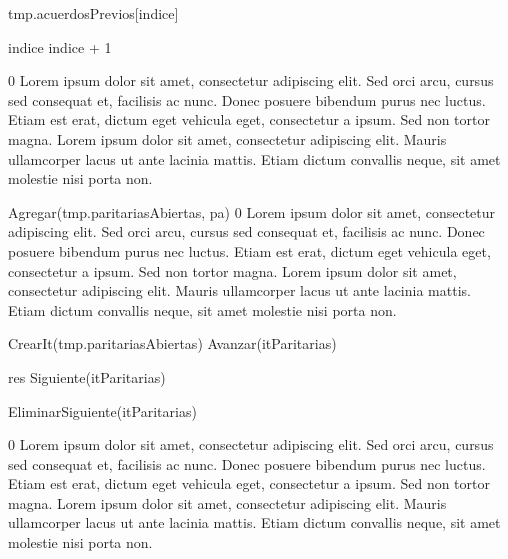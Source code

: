 {
	\state {} 					
			
		\state

		\state tmp.acuerdosPrevios[indice] 			

		\state
		\state indice \asig indice + 1					
	\endwhile
}
{0}
{Lorem ipsum dolor sit amet, consectetur adipiscing elit. Sed orci arcu, cursus sed consequat et, facilisis ac nunc. Donec posuere bibendum purus nec luctus. Etiam est erat, dictum eget vehicula eget, consectetur a ipsum. Sed non tortor magna. Lorem ipsum dolor sit amet, consectetur adipiscing elit. Mauris ullamcorper lacus ut ante lacinia mattis. Etiam dictum convallis neque, sit amet molestie nisi porta non.}

{
	\state Agregar(tmp.paritariasAbiertas, pa)		
}
{0}
{Lorem ipsum dolor sit amet, consectetur adipiscing elit. Sed orci arcu, cursus sed consequat et, facilisis ac nunc. Donec posuere bibendum purus nec luctus. Etiam est erat, dictum eget vehicula eget, consectetur a ipsum. Sed non tortor magna. Lorem ipsum dolor sit amet, consectetur adipiscing elit. Mauris ullamcorper lacus ut ante lacinia mattis. Etiam dictum convallis neque, sit amet molestie nisi porta non.}

{
	\state {} \asig CrearIt(tmp.paritariasAbiertas)		
			
		\state
		\state Avanzar(itParitarias)							
	\endwhile
	\state

	\state res \asig Siguiente(itParitarias)					

	\state EliminarSiguiente(itParitarias)						
}
{0}
{Lorem ipsum dolor sit amet, consectetur adipiscing elit. Sed orci arcu, cursus sed consequat et, facilisis ac nunc. Donec posuere bibendum purus nec luctus. Etiam est erat, dictum eget vehicula eget, consectetur a ipsum. Sed non tortor magna. Lorem ipsum dolor sit amet, consectetur adipiscing elit. Mauris ullamcorper lacus ut ante lacinia mattis. Etiam dictum convallis neque, sit amet molestie nisi porta non.}

